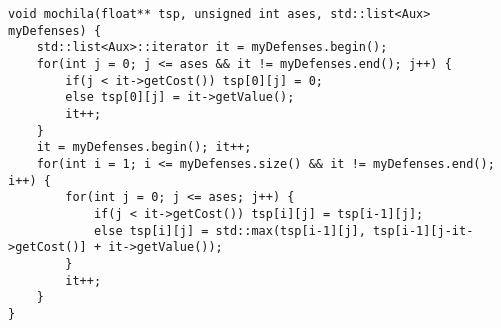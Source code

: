 \begin{lstlisting}
void mochila(float** tsp, unsigned int ases, std::list<Aux> myDefenses) {
    std::list<Aux>::iterator it = myDefenses.begin();
    for(int j = 0; j <= ases && it != myDefenses.end(); j++) {
        if(j < it->getCost()) tsp[0][j] = 0;
        else tsp[0][j] = it->getValue();
        it++;
    }
    it = myDefenses.begin(); it++;
    for(int i = 1; i <= myDefenses.size() && it != myDefenses.end(); i++) {
        for(int j = 0; j <= ases; j++) {
            if(j < it->getCost()) tsp[i][j] = tsp[i-1][j];
            else tsp[i][j] = std::max(tsp[i-1][j], tsp[i-1][j-it->getCost()] + it->getValue());
        }
        it++;
    }
}
\end{lstlisting}